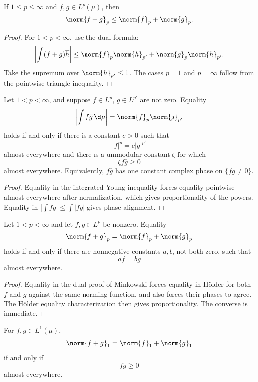 \begin{thm}
If $1\leq p\leq\infty$ and $f,g\in L^p(\mu)$, then
\[
\norm{f+g}_p\leq\norm{f}_p+\norm{g}_p.
\]
\end{thm}

\begin{proof}
For $1<p<\infty$, use the dual formula:
\[
\left|\int(f+g)\overline h\right|
\leq\norm{f}_p\norm{h}_{p'}+\norm{g}_p\norm{h}_{p'}.
\]
Take the supremum over $\norm{h}_{p'}\leq1$. The cases $p=1$ and $p=\infty$ follow from the pointwise triangle inequality.
\end{proof}

\begin{prop}
Let $1<p<\infty$, and suppose $f\in L^p$, $g\in L^{p'}$ are not zero. Equality
\[
\left|\int f\overline g\,\d\mu\right|=\norm{f}_p\norm{g}_{p'}
\]
holds if and only if there is a constant $c>0$ such that
\[
|f|^p=c|g|^{p'}
\]
almost everywhere and there is a unimodular constant $\zeta$ for which
\[
\zeta f\overline g\geq0
\]
almost everywhere. Equivalently, $f\overline g$ has one constant complex phase on $\{fg\neq0\}$.
\end{prop}

\begin{proof}
Equality in the integrated Young inequality forces equality pointwise almost everywhere after normalization, which gives proportionality of the powers. Equality in $|\int f\overline g|\leq\int|fg|$ gives phase alignment.
\end{proof}

\begin{prop}
Let $1<p<\infty$ and let $f,g\in L^p$ be nonzero. Equality
\[
\norm{f+g}_p=\norm{f}_p+\norm{g}_p
\]
holds if and only if there are nonnegative constants $a,b$, not both zero, such that
\[
af=bg
\]
almost everywhere.
\end{prop}

\begin{proof}
Equality in the dual proof of Minkowski forces equality in Hölder for both $f$ and $g$ against the same norming function, and also forces their phases to agree. The Hölder equality characterization then gives proportionality. The converse is immediate.
\end{proof}

\begin{prop}
For $f,g\in L^1(\mu)$,
\[
\norm{f+g}_1=\norm{f}_1+\norm{g}_1
\]
if and only if
\[
f\overline g\geq0
\]
almost everywhere.
\end{prop}

